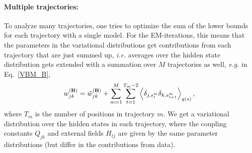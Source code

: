 \paragraph{Multiple trajectories:}
To analyze many trajectories, one tries to optimize the sum of the
lower bounds for each trajectory with a single model. For the
EM-iterations, this means that the parameters in the variational
distributions get contributions from each trajectory that are just
summed up, \textit{i.e.} averages over the hidden state distribution
gets extended with a summation over $M$ trajectories as
well, \textit{e.g.} in Eq.~\eqref{VBM_B},
\begin{equation}
w_{jk}^{(\mathbf{B})}=\tilde w_{jk}^{(\mathbf{B})}
  +\sum_{m=1}^M\sum_{t=1}^{T_m-2}\left\langle \delta_{j,s^m_t}\delta_{k,s^m_{t+1}}\right\rangle_{q(s)},
\end{equation}
where $T_m$ is the number of positions in trajectory $m$. We get a
variational distribution over the hidden states in each trajectory,
where the coupling constants $Q_{jk}$ and external fields $H_{tj}$ are
given by the same parameter distributions (but differ in the
contributions from data).



